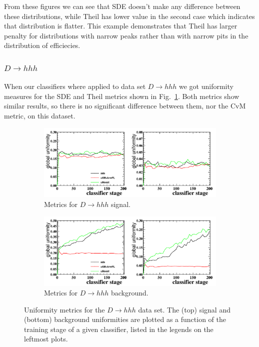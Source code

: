 From these figures we can see that SDE doesn't make any difference between these distributions, while Theil has lower value in the second case 
which indicates that distribution is flatter. This example demonstrates that Theil has larger penalty for distributions with narrow peaks rather than with narrow pits in the distribution of efficiecies.

\subsubsection*{$D \to hhh$}
When our classifiers where applied to data set $D \to hhh$ we got uniformity measures for the SDE and Theil
metrics shown in Fig.~\ref{fig:d2hhhsdetheil}.
Both metrics show similar results, so there is no significant difference between them, nor the CvM metric, on this dataset.

\begin{figure}[h]
\centering
		\begin{subfigure}[b]{0.48\textwidth}
			\includegraphics[width=\textwidth]{graphs/D23hSignalEffs.png}
			\caption{Metrics for $D \to hhh$ signal.}
		\end{subfigure}
		\begin{subfigure}[b]{0.48\textwidth}
			\includegraphics[width=\textwidth]{graphs/D23hBgEffs.png}
			\caption{Metrics for $D \to hhh$ background.}
		\end{subfigure}
		\caption{Uniformity metrics for the $D \to hhh$ data set. The (top) signal and (bottom) background uniformities are plotted as a function of the training stage of a given classifier, listed in the legends on the leftmost plots. \label{fig:d2hhhsdetheil}}
\end{figure}

